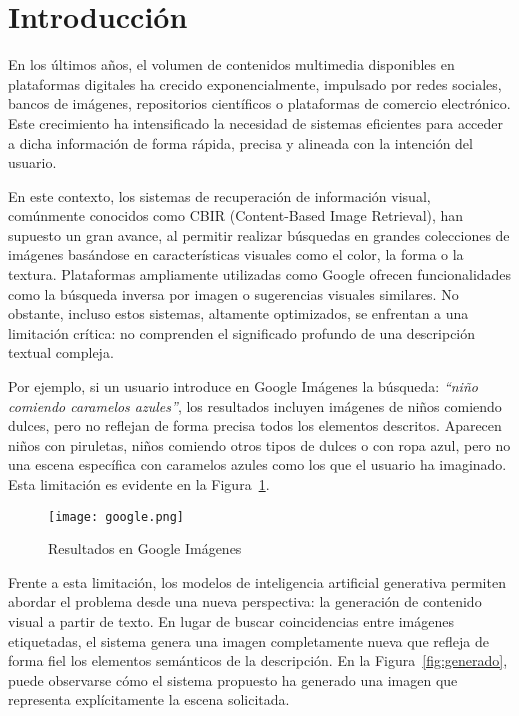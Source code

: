 \section{Introducción}
En los últimos años, el volumen de contenidos multimedia disponibles en plataformas digitales ha crecido exponencialmente, impulsado por redes sociales, bancos de imágenes, repositorios científicos o plataformas de comercio electrónico. Este crecimiento ha intensificado la necesidad de sistemas eficientes para acceder a dicha información de forma rápida, precisa y alineada con la intención del usuario.

En este contexto, los sistemas de recuperación de información visual, comúnmente conocidos como CBIR (Content-Based Image Retrieval), han supuesto un gran avance, al permitir realizar búsquedas en grandes colecciones de imágenes basándose en características visuales como el color, la forma o la textura. Plataformas ampliamente utilizadas como Google ofrecen funcionalidades como la búsqueda inversa por imagen o sugerencias visuales similares. No obstante, incluso estos sistemas, altamente optimizados, se enfrentan a una limitación crítica: no comprenden el significado profundo de una descripción textual compleja.

Por ejemplo, si un usuario introduce en Google Imágenes la búsqueda: \textit{``niño comiendo caramelos azules''}, los resultados incluyen imágenes de niños comiendo dulces, pero no reflejan de forma precisa todos los elementos descritos. Aparecen niños con piruletas, niños comiendo otros tipos de dulces o con ropa azul, pero no una escena específica con caramelos azules como los que el usuario ha imaginado. Esta limitación es evidente en la Figura~\ref{fig:google_search}.

\begin{figure}[H]
    \centering
    \texttt{[image: google.png]}
    \caption{Resultados en Google Imágenes}
    \label{fig:google_search}
\end{figure}

Frente a esta limitación, los modelos de inteligencia artificial generativa permiten abordar el problema desde una nueva perspectiva: la generación de contenido visual a partir de texto. En lugar de buscar coincidencias entre imágenes etiquetadas, el sistema genera una imagen completamente nueva que refleja de forma fiel los elementos semánticos de la descripción. En la Figura~\ref{fig:generado}, puede observarse cómo el sistema propuesto ha generado una imagen que representa explícitamente la escena solicitada.

